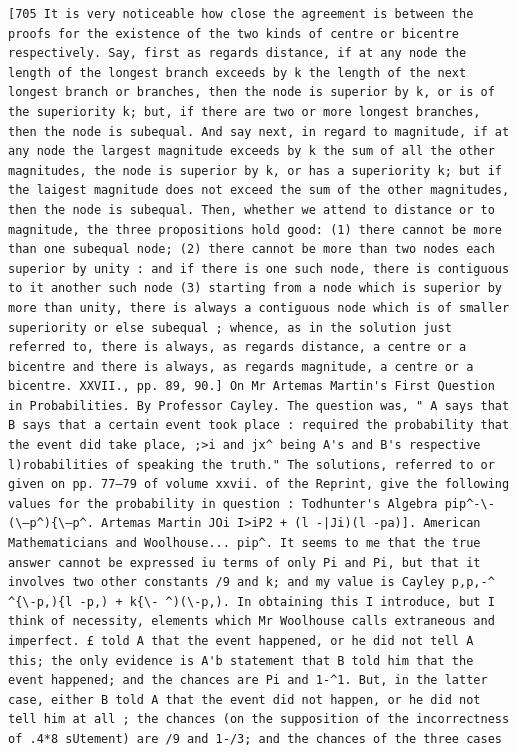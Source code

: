 \documentclass[12pt]{article}
\theoremstyle{plain}
\begin{document}
\newpage
\setcounter{page}{600}
\begin{verbatim}
[705 It is very noticeable how close the agreement is between the proofs for the existence of the two kinds of centre or bicentre respectively. Say, first as regards distance, if at any node the length of the longest branch exceeds by k the length of the next longest branch or branches, then the node is superior by k, or is of the superiority k; but, if there are two or more longest branches, then the node is subequal. And say next, in regard to magnitude, if at any node the largest magnitude exceeds by k the sum of all the other magnitudes, the node is superior by k, or has a superiority k; but if the laigest magnitude does not exceed the sum of the other magnitudes, then the node is subequal. Then, whether we attend to distance or to magnitude, the three propositions hold good: (1) there cannot be more than one subequal node; (2) there cannot be more than two nodes each superior by unity : and if there is one such node, there is contiguous to it another such node (3) starting from a node which is superior by more than unity, there is always a contiguous node which is of smaller superiority or else subequal ; whence, as in the solution just referred to, there is always, as regards distance, a centre or a bicentre and there is always, as regards magnitude, a centre or a bicentre. XXVII., pp. 89, 90.] On Mr Artemas Martin's First Question in Probabilities. By Professor Cayley. The question was, " A says that B says that a certain event took place : required the probability that the event did take place, ;>i and jx^ being A's and B's respective l)robabilities of speaking the truth." The solutions, referred to or given on pp. 77—79 of volume xxvii. of the Reprint, give the following values for the probability in question : Todhunter's Algebra pip^-\- (\—p^){\—p^. Artemas Martin JOi I>iP2 + (l -|Ji)(l -pa)]. American Mathematicians and Woolhouse... pip^. It seems to me that the true answer cannot be expressed iu terms of only Pi and Pi, but that it involves two other constants /9 and k; and my value is Cayley p,p,-^ ^{\-p,){l -p,) + k{\- ^)(\-p,). In obtaining this I introduce, but I think of necessity, elements which Mr Woolhouse calls extraneous and imperfect. £ told A that the event happened, or he did not tell A this; the only evidence is A'b statement that B told him that the event happened; and the chances are Pi and 1-^1. But, in the latter case, either B told A that the event did not happen, or he did not tell him at all ; the chances (on the supposition of the incorrectness of .4*8 sUtement) are /9 and 1-/3; and the chances of the three cases 
\end{verbatim}
\end{document}
